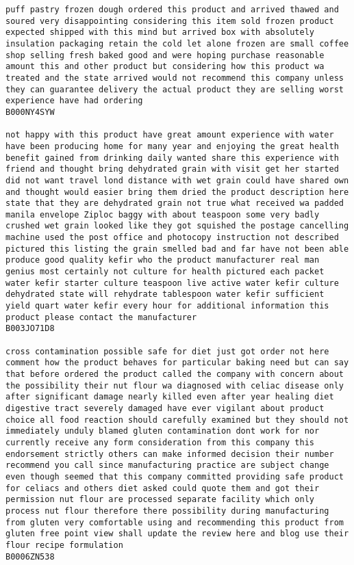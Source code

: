 \documentclass[11pt]{article}
\begin{document}
\begin{Verbatim}[commandchars=\\\{\}]
puff pastry frozen dough ordered this product and arrived thawed and soured very disappointing considering this item sold frozen product expected shipped with this mind but arrived box with absolutely insulation packaging retain the cold let alone frozen are small coffee shop selling fresh baked good and were hoping purchase reasonable amount this and other product but considering how this product wa treated and the state arrived would not recommend this company unless they can guarantee delivery the actual product they are selling worst experience have had ordering
B000NY4SYW

not happy with this product have great amount experience with water have been producing home for many year and enjoying the great health benefit gained from drinking daily wanted share this experience with friend and thought bring dehydrated grain with visit get her started did not want travel lond distance with wet grain could have shared own and thought would easier bring them dried the product description here state that they are dehydrated grain not true what received wa padded manila envelope Ziploc baggy with about teaspoon some very badly crushed wet grain looked like they got squished the postage cancelling machine used the post office and photocopy instruction not described pictured this listing the grain smelled bad and far have not been able produce good quality kefir who the product manufacturer real man genius most certainly not culture for health pictured each packet water kefir starter culture teaspoon live active water kefir culture dehydrated state will rehydrate tablespoon water kefir sufficient yield quart water kefir every hour for additional information this product please contact the manufacturer
B003JO71D8

cross contamination possible safe for diet just got order not here comment how the product behaves for particular baking need but can say that before ordered the product called the company with concern about the possibility their nut flour wa diagnosed with celiac disease only after significant damage nearly killed even after year healing diet digestive tract severely damaged have ever vigilant about product choice all food reaction should carefully examined but they should not immediately unduly blamed gluten contamination dont work for nor currently receive any form consideration from this company this endorsement strictly others can make informed decision their number recommend you call since manufacturing practice are subject change even though seemed that this company committed providing safe product for celiacs and others diet asked could quote them and got their permission nut flour are processed separate facility which only process nut flour therefore there possibility during manufacturing from gluten very comfortable using and recommending this product from gluten free point view shall update the review here and blog use their flour recipe formulation
B0006ZN538


\end{Verbatim}
\end{document}
